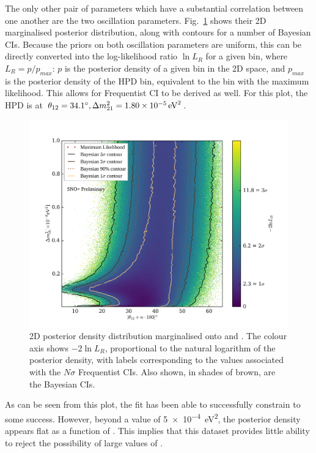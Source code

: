 The only other pair of parameters which have a substantial correlation between one another are the two oscillation parameters. Fig.~\ref{fig:2d_osc_param_posterior} shows their 2D marginalised posterior distribution, along with contours for a number of Bayesian CIs. Because the priors on both oscillation parameters are uniform, this can be directly converted into the log-likelihood ratio $\ln{L_{R}}$ for a given bin, where $L_{R} = p/p_{max}$: $p$ is the posterior density of a given bin in the 2D space, and $p_{max}$ is the posterior density of the HPD bin, equivalent to the bin with the maximum likelihood. This allows for Frequentist CI to be derived as well. For this plot, the HPD is at $\tonetwo{} = \ang{34.1}, \dmsq{} = \SI{1.80e-5}{\eV\squared}$.

\begin{figure}[!th]
    \centering
    \includegraphics[width=\textwidth]{6_SolarAnalysis/images/steve_style_contours.png}
    \caption[2D posterior density distribution marginalised onto \dmsq{} and \tonetwo{}]
    {2D posterior density distribution marginalised onto \dmsq{} and \tonetwo{}. The colour axis shows $-2\ln{L_{R}}$, proportional to the natural logarithm of the posterior density, with labels corresponding to the values associated with the $N\sigma$ Frequentist CIs. Also shown, in shades of brown, are the Bayesian CIs.}
    \label{fig:2d_osc_param_posterior}
\end{figure}

As can be seen from this plot, the fit has been able to successfully constrain \tonetwo{} to some success. However, beyond a value of \SI{5e-4}{\eV\squared}, the posterior density appears flat as a function of \dmsq{}. This implies that this dataset provides little ability to reject the possibility of large values of \dmsq{}.

